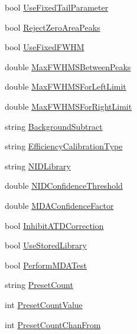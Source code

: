 \begin{DoxyCompactItemize}
bool \hyperlink{class_scintilab_1_1_detector_a2c25fcf9cf3fdab6e7cba6b76775d322}{Use\+Fixed\+Tail\+Parameter}
\item 
bool \hyperlink{class_scintilab_1_1_detector_a9587339739ef2fb6a5a813ac49cf8025}{Reject\+Zero\+Area\+Peaks}
\item 
bool \hyperlink{class_scintilab_1_1_detector_a291b690d9f2ec1266fad776c5418bf08}{Use\+Fixed\+F\+W\+H\+M}
\item 
double \hyperlink{class_scintilab_1_1_detector_a54469032972e274893df0654113c2e10}{Max\+F\+W\+H\+M\+S\+Between\+Peaks}
\item 
double \hyperlink{class_scintilab_1_1_detector_a2cb757183e87f6350f473d1b9c569ca5}{Max\+F\+W\+H\+M\+S\+For\+Left\+Limit}
\item 
double \hyperlink{class_scintilab_1_1_detector_a6aa0a6c4d52a5651ba1ed2c52d07b65b}{Max\+F\+W\+H\+M\+S\+For\+Right\+Limit}
\item 
string \hyperlink{class_scintilab_1_1_detector_a57164b66f6f92c0443d9c9aad2bd327b}{Background\+Subtract}
\item 
string \hyperlink{class_scintilab_1_1_detector_a796c310b6aeedbce374b9386f910a499}{Efficiency\+Calibration\+Type}
\item 
string \hyperlink{class_scintilab_1_1_detector_a707e92eaf7866c8f8559fae65d82a500}{N\+I\+D\+Library}
\item 
double \hyperlink{class_scintilab_1_1_detector_a44eef95ccfd5a66543e42d9e3f3dabd2}{N\+I\+D\+Confidence\+Threshold}
\item 
double \hyperlink{class_scintilab_1_1_detector_ad50504bdff73cd41a3e5ba9baefbf968}{M\+D\+A\+Confidence\+Factor}
\item 
bool \hyperlink{class_scintilab_1_1_detector_a2439ae55b919de48bade665495af4204}{Inhibit\+A\+T\+D\+Correction}
\item 
bool \hyperlink{class_scintilab_1_1_detector_a190207abf3f03edb5868c178c3957a29}{Use\+Stored\+Library}
\item 
bool \hyperlink{class_scintilab_1_1_detector_af85caf543049c7e1be4cfc050c8982b3}{Perform\+M\+D\+A\+Test}
\item 
string \hyperlink{class_scintilab_1_1_detector_a68bb937831fda468f20adeea6e8b94ea}{Preset\+Count}
\item 
int \hyperlink{class_scintilab_1_1_detector_ab0732d0c890144b9cefd26d4ebb0949a}{Preset\+Count\+Value}
\item 
int \hyperlink{class_scintilab_1_1_detector_a5ce2bf264c5973c9203a339260b0ac1b}{Preset\+Count\+Chan\+From}
\item 

\end{DoxyCompactItemize}
